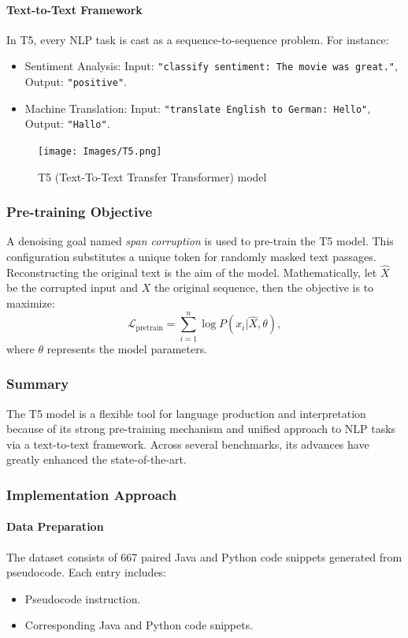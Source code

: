 \documentclass{dhbenelux}
\begin{document}
\paragraph{Text-to-Text Framework}
In T5, every NLP task is cast as a sequence-to-sequence problem. For instance:
\begin{itemize}
    \item Sentiment Analysis: Input: \texttt{"classify sentiment: The movie was great."}, Output: \texttt{"positive"}.
    \item Machine Translation: Input: \texttt{"translate English to German: Hello"}, Output: \texttt{"Hallo"}.
\end{itemize}

\begin{figure}[h]
\caption{ T5 (Text-To-Text Transfer Transformer) model}
\centering
\texttt{[image: Images/T5.png]}
\end{figure}

\subsubsection{Pre-training Objective}
A denoising goal named \textit{span corruption} is used to pre-train the T5 model. This configuration substitutes a unique token for randomly masked text passages. Reconstructing the original text is the aim of the model.  Mathematically, let $\hat{X}$ be the corrupted input and $X$ the original sequence, then the objective is to maximize:
\begin{equation}
\mathcal{L}_{\text{pretrain}} = \sum_{i=1}^n \log P(x_i | \hat{X}, \theta),
\end{equation}
where $\theta$ represents the model parameters.

\subsubsection{Summary}
The T5 model is a flexible tool for language production and interpretation because of its strong pre-training mechanism and unified approach to NLP tasks via a text-to-text framework. Across several benchmarks, its advances have greatly enhanced the state-of-the-art.


\subsubsection{Implementation Approach}

\paragraph{Data Preparation} The dataset consists of 667 paired Java and Python code snippets generated from pseudocode. Each entry includes:
\begin{itemize}
    \item Pseudocode instruction.
    \item Corresponding Java and Python code snippets.
\end{itemize}
\end{document}
